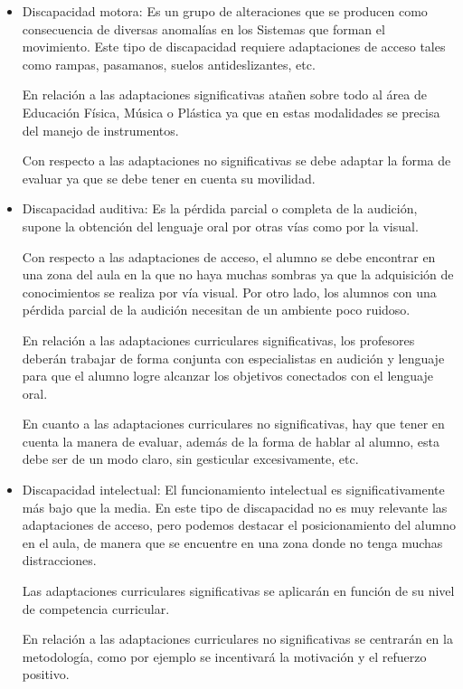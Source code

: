 \begin{itemize}
    \item Discapacidad motora: Es un grupo de alteraciones que se producen como consecuencia de diversas anomalías en los Sistemas que forman el movimiento. Este tipo de discapacidad requiere  adaptaciones de acceso tales como rampas, pasamanos, suelos antideslizantes, etc. 
    
    En relación a las adaptaciones significativas atañen sobre todo al área de Educación Física, Música o Plástica ya que en estas modalidades se precisa del manejo de instrumentos. 

    Con respecto a las adaptaciones no significativas se debe adaptar la forma de evaluar ya que se debe tener en cuenta su movilidad. 
    
    \item Discapacidad auditiva: Es la pérdida parcial o completa de la audición, supone la obtención del lenguaje oral por otras vías como por la visual. 
    
    Con respecto a las adaptaciones de acceso, el alumno se debe encontrar en una zona del aula en la que no haya muchas sombras ya que la adquisición de conocimientos se realiza por vía visual. Por otro lado, los alumnos con una pérdida parcial de la audición necesitan de un ambiente poco ruidoso. 
    
    En relación a las adaptaciones curriculares significativas, los profesores deberán trabajar de forma conjunta con especialistas en audición y lenguaje para que el alumno logre alcanzar los objetivos conectados con el lenguaje oral.

    En cuanto a las adaptaciones curriculares no significativas, hay que tener en cuenta la manera de evaluar, además de la forma de hablar al alumno, esta debe ser de un modo claro, sin gesticular excesivamente, etc.
    
    \item Discapacidad intelectual: El funcionamiento intelectual es significativamente más bajo que la media. En este tipo de discapacidad no es muy relevante las adaptaciones de acceso, pero podemos destacar el posicionamiento del alumno en el aula, de manera que se encuentre en una zona donde no tenga muchas distracciones.
    
    Las adaptaciones curriculares significativas se aplicarán en función de su nivel de competencia curricular. 

    En relación a las adaptaciones curriculares no significativas se centrarán en la metodología, como por ejemplo se incentivará la motivación y el refuerzo positivo.
    

\end{itemize}
